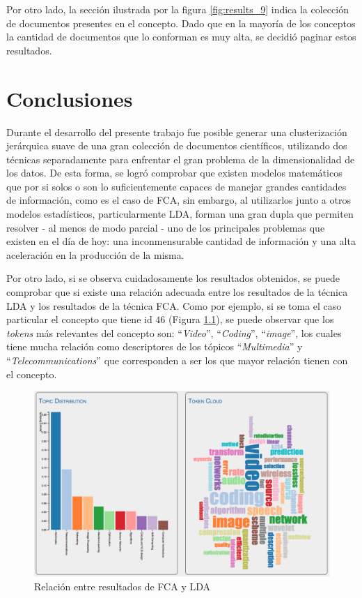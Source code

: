 \documentclass[12pt,oneside,letterpaper]{book}
\newcommand{\eng}[1]{\textit{#1}\xspace}			%
\newcommand{\abr}[1]{\textsc{#1}\xspace}           %
\theoremstyle{definition}
\begin{document}
Por otro lado, la sección ilustrada por la figura \ref{fig:results_9} indica la colección de documentos presentes en el concepto. Dado que en la mayoría de los conceptos la cantidad de documentos que lo conforman es muy alta, se decidió paginar estos resultados.

\chapter{Conclusiones}
Durante el desarrollo del presente trabajo fue posible generar una clusterización jerárquica suave de una gran colección de documentos científicos, utilizando dos técnicas separadamente para enfrentar el gran problema de la dimensionalidad de los datos. De esta forma, se logró comprobar que existen modelos matemáticos que por si solos o son lo suficientemente capaces de manejar grandes cantidades de información, como es el caso de \abr{FCA}, sin embargo, al utilizarlos junto a otros modelos estadísticos, particularmente \abr{LDA}, forman una gran dupla que permiten resolver - al menos de modo parcial - uno de los principales problemas que existen en el día de hoy: una inconmensurable cantidad de información y una alta aceleración en la producción de la misma.

Por otro lado, si se observa cuidadosamente los resultados obtenidos, se puede comprobar que si existe una relación adecuada entre los resultados de la técnica \abr{LDA} y los resultados de la técnica \abr{FCA}. Como por ejemplo, si se toma el caso particular el concepto que tiene id $46$ (Figura \ref{fig:conclusiones_1}), se puede observar que los \eng{tokens} más relevantes del concepto son: ``\eng{Video}'', ``\eng{Coding}'', ``\eng{image}'', los cuales tiene mucha relación como descriptores de los tópicos ``\eng{Multimedia}'' y ``\eng{Telecommunications}'' que corresponden a ser los que mayor relación tienen con el concepto.

 \begin{figure}[h!]
	\centering
	\includegraphics[width=1\textwidth]{images/conclusiones_1.png}
	\caption{Relación entre resultados de \abr{FCA} y \abr{LDA}}
	\label{fig:conclusiones_1}
\end{figure}
\end{document}
